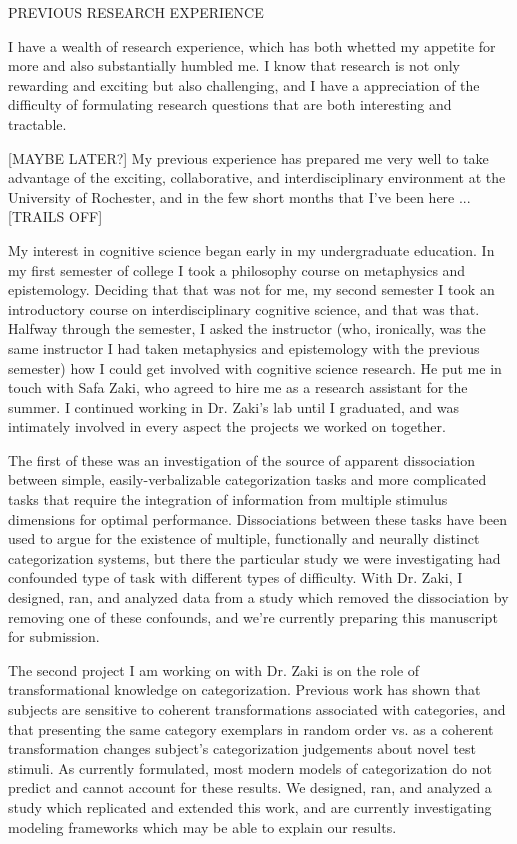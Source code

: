 \documentclass[12pt]{article}
\begin{document}
PREVIOUS RESEARCH EXPERIENCE

I have a wealth of research experience, which has both whetted my appetite for more and also substantially humbled me.  I know that research is not only rewarding and exciting but also challenging, and I have a appreciation of the difficulty of formulating research questions that are both interesting and tractable.  

[MAYBE LATER?] My previous experience has prepared me very well to take advantage of the exciting, collaborative, and interdisciplinary environment at the University of Rochester, and in the few short months that I've been here ... [TRAILS OFF]


My interest in cognitive science began early in my undergraduate education.  In my first semester of college I took a philosophy course on metaphysics and epistemology.  Deciding that that was not for me, my second semester I took an introductory course on interdisciplinary cognitive science, and that was that.  Halfway through the semester, I asked the instructor (who, ironically, was the same instructor I had taken metaphysics and epistemology with the previous semester) how I could get involved with cognitive science research.  He put me in touch with Safa Zaki, who agreed to hire me as a research assistant for the summer.  I continued working in Dr. Zaki's lab until I graduated, and was intimately involved in every aspect the projects we worked on together.  

The first of these was an investigation of the source of apparent dissociation between simple, easily-verbalizable categorization tasks and more complicated tasks that require the integration of information from multiple stimulus dimensions for optimal performance.  Dissociations between these tasks have been used to argue for the existence of multiple, functionally and neurally distinct categorization systems, but there the particular study we were investigating had confounded type of task with different types of difficulty.  With Dr. Zaki, I designed, ran, and analyzed data from a study which removed the dissociation by removing one of these confounds, and we're currently preparing this manuscript for submission.  

The second project I am working on with Dr. Zaki is on the role of transformational knowledge on categorization.  Previous work has shown that subjects are sensitive to coherent transformations associated with categories, and that presenting the same category exemplars in random order vs. as a coherent transformation changes subject's categorization judgements about novel test stimuli.  As currently formulated, most modern models of categorization do not predict and cannot account for these results.  We designed, ran, and analyzed a study which replicated and extended this work, and are currently investigating modeling frameworks which may be able to explain our results.  
\end{document}
